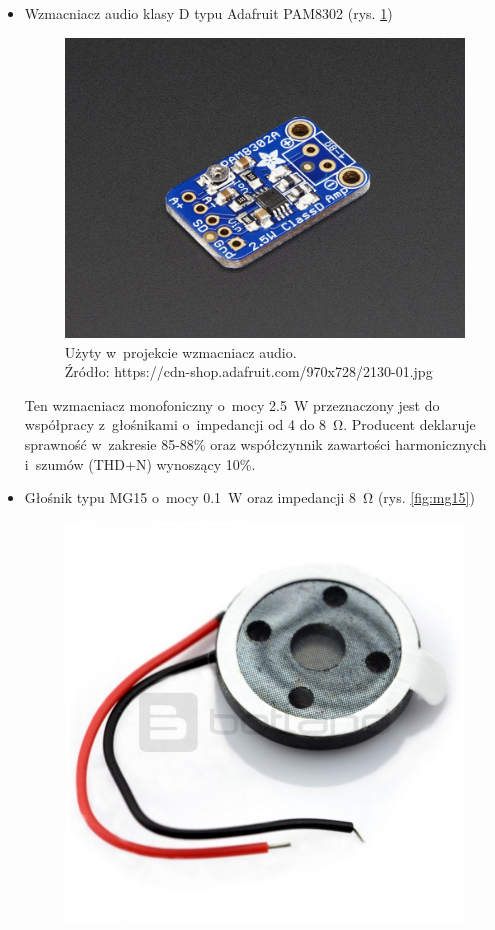 \begin{enumerate}
\begin{itemize}
		\item Wzmacniacz audio klasy D typu Adafruit PAM8302 (rys. \ref{fig:pam8302})\\
		\begin{figure}[h!]
			\centering
			\includegraphics[scale=0.2]{../Assets/wzmacniacz_pam8302.png}
			\caption{Użyty w~projekcie wzmacniacz audio.\\ Źródło: https://cdn-shop.adafruit.com/970x728/2130-01.jpg}
			\label{fig:pam8302}
		\end{figure}
		Ten wzmacniacz monofoniczny o~mocy \SI{2.5}{\W} przeznaczony jest do współpracy z~głośnikami o~impedancji od \SI{4}{} do \SI{8}{\ohm}. Producent deklaruje sprawność w~zakresie 85-88\% \cite{speakeropamp} oraz współczynnik zawartości harmonicznych i~szumów (THD+N) wynoszący 10\%.
		\item Głośnik typu MG15 o~mocy \SI{0.1}{\W} oraz impedancji \SI{8}{\ohm} (rys. \ref{fig:mg15})\\
		\begin{figure}[h!]
			\centering
			\includegraphics[scale=0.1]{../Assets/glosnik_mg15.png}

\end{figure}
\end{itemize}
\end{enumerate}

